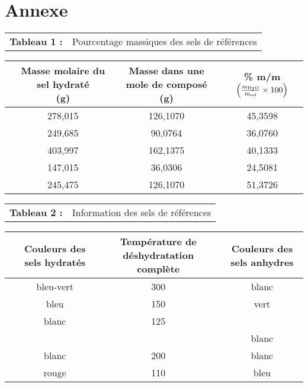 \documentclass[11pt]{article}
\begin{document}
\section*{Annexe}
\vspace{-3mm}\noindent\setlength\tabcolsep{0pt}
\begin{center}
\begin{tabularx}{{\textwidth}}{lX}
	  \textbf{Tableau 1 : }
	& \raggedright Pourcentage massiques des sels de références
\end{tabularx}
\begin{tabularx}{{\textwidth}}{|C|S[table-format=3.3]|S[table-format=3.4]|S[table-format=2.4]|}
\hline
	& \parbox[c]{27mm}{\centering Masse molaire du sel hydraté\\(g)}
	& \parbox[c]{37mm}{\centering Masse  dans une mole de composé\\(g)}
	& \parbox[c]{25mm}{\centering \% m/m\\$\left (\frac{\mathrm{m_{\ce{H2O}}}}{\mathrm{m_{\text{sel}}}}\times 100\right )$}\\
\hline
	& 278,015
	& 126,1070
	& 45,3598\\
\hline
	& 249,685
	& 90,0764
	& 36,0760\\
\hline
	& 403,997
	& 162,1375
	& 40,1333\\
\hline
	& 147,015
	& 36,0306
	& 24,5081\\
\hline
	& 245,475
	& 126,1070
	& 51,3726\\
\hline
\end{tabularx}
\end{center}

\noindent\setlength\tabcolsep{0pt}
\begin{center}
\begin{tabularx}{{\textwidth}}{lX}
	  \textbf{Tableau 2 : }
	& \raggedright Information des sels de références
\end{tabularx}
\begin{tabularx}{{\textwidth}}{|C|C|C|C|}
\hline
	& \parbox[c]{30mm}{\centering Couleurs des sels hydratés}
	& \parbox[c]{30mm}{\centering Température de déshydratation complète}
	& \parbox[c]{30mm}{\centering Couleurs des sels anhydres}\\
\hline
	& bleu-vert
	& 300
	& blanc\\
\hline
	& bleu
	& 150
	& vert\\
\hline
	& blanc
	& 125
	& \\
\hline
	& 
	& 
	& blanc\\
\hline
	& blanc
	& 200
	& blanc\\
\hline
	& rouge
	& 110
	& bleu\\
\hline
\end{tabularx}
\end{center}
\end{document}
